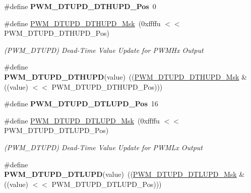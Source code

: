 \begin{DoxyCompactItemize}
\mbox{\label{group__SAMV71__PWM_ga57d565acd6fcde451487298836d3cd63}} 
\#define {\bfseries P\+W\+M\+\_\+\+D\+T\+U\+P\+D\+\_\+\+D\+T\+H\+U\+P\+D\+\_\+\+Pos}~0
\item 
\mbox{\label{group__SAMV71__PWM_ga57ae02641d423c938151d286815103df}} 
\#define \mbox{\hyperlink{group__SAMV71__PWM_ga57ae02641d423c938151d286815103df}{P\+W\+M\+\_\+\+D\+T\+U\+P\+D\+\_\+\+D\+T\+H\+U\+P\+D\+\_\+\+Msk}}~(0xffffu $<$$<$ P\+W\+M\+\_\+\+D\+T\+U\+P\+D\+\_\+\+D\+T\+H\+U\+P\+D\+\_\+\+Pos)
\begin{DoxyCompactList}\small\item\em (P\+W\+M\+\_\+\+D\+T\+U\+PD) Dead-\/\+Time Value Update for P\+W\+M\+Hx Output \end{DoxyCompactList}\item 
\mbox{\label{group__SAMV71__PWM_ga3fe8d0acfd4ae28378e6a670c7da8609}} 
\#define {\bfseries P\+W\+M\+\_\+\+D\+T\+U\+P\+D\+\_\+\+D\+T\+H\+U\+PD}(value)~((\mbox{\hyperlink{group__SAMV71__PWM_ga57ae02641d423c938151d286815103df}{P\+W\+M\+\_\+\+D\+T\+U\+P\+D\+\_\+\+D\+T\+H\+U\+P\+D\+\_\+\+Msk}} \& ((value) $<$$<$ P\+W\+M\+\_\+\+D\+T\+U\+P\+D\+\_\+\+D\+T\+H\+U\+P\+D\+\_\+\+Pos)))
\item 
\mbox{\label{group__SAMV71__PWM_ga4e46448671db77abc6a8c3b5e9fc07c5}} 
\#define {\bfseries P\+W\+M\+\_\+\+D\+T\+U\+P\+D\+\_\+\+D\+T\+L\+U\+P\+D\+\_\+\+Pos}~16
\item 
\mbox{\label{group__SAMV71__PWM_ga745c5dc8738555fd8ccbdf9340af5af9}} 
\#define \mbox{\hyperlink{group__SAMV71__PWM_ga745c5dc8738555fd8ccbdf9340af5af9}{P\+W\+M\+\_\+\+D\+T\+U\+P\+D\+\_\+\+D\+T\+L\+U\+P\+D\+\_\+\+Msk}}~(0xffffu $<$$<$ P\+W\+M\+\_\+\+D\+T\+U\+P\+D\+\_\+\+D\+T\+L\+U\+P\+D\+\_\+\+Pos)
\begin{DoxyCompactList}\small\item\em (P\+W\+M\+\_\+\+D\+T\+U\+PD) Dead-\/\+Time Value Update for P\+W\+M\+Lx Output \end{DoxyCompactList}\item 
\mbox{\label{group__SAMV71__PWM_ga1ca97073704403153057db53eb67395d}} 
\#define {\bfseries P\+W\+M\+\_\+\+D\+T\+U\+P\+D\+\_\+\+D\+T\+L\+U\+PD}(value)~((\mbox{\hyperlink{group__SAMV71__PWM_ga745c5dc8738555fd8ccbdf9340af5af9}{P\+W\+M\+\_\+\+D\+T\+U\+P\+D\+\_\+\+D\+T\+L\+U\+P\+D\+\_\+\+Msk}} \& ((value) $<$$<$ P\+W\+M\+\_\+\+D\+T\+U\+P\+D\+\_\+\+D\+T\+L\+U\+P\+D\+\_\+\+Pos)))

\end{DoxyCompactItemize}
